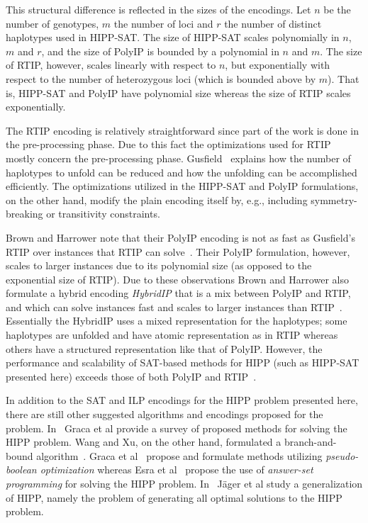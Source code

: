 \documentclass[12pt,a4paper]{article}
\begin{document}
This structural difference is reflected in the sizes of the encodings.
Let $n$ be the number of genotypes, $m$ the number of loci and $r$ the number of distinct haplotypes used in HIPP-SAT.
The size of HIPP-SAT scales polynomially in $n$, $m$ and $r$, and the size of PolyIP is bounded by a polynomial in $n$ and $m$.
The size of RTIP, however, scales linearly with respect to $n$, but exponentially with respect to the number of heterozygous loci (which is bounded above by $m$).
That is, HIPP-SAT and PolyIP have polynomial size whereas the size of RTIP scales exponentially.

The RTIP encoding is relatively straightforward since part of the work is done in the pre-processing phase.
Due to this fact the optimizations used for RTIP mostly concern the pre-processing phase.
Gusfield~\cite{DBLP:conf/cpm/Gusfield03} explains how the number of haplotypes to unfold can be reduced and how the unfolding can be accomplished efficiently.
The optimizations utilized in the HIPP-SAT and PolyIP formulations, on the other hand, modify the plain encoding itself by, e.g., including symmetry-breaking or transitivity constraints.

Brown and Harrower note that their PolyIP encoding is not as fast as Gusfield's RTIP over instances that RTIP can solve~\cite{DBLP:journals/tcbb/BrownH06}.
Their PolyIP formulation, however, scales to larger instances due to its polynomial size (as opposed to the exponential size of RTIP).
Due to these observations Brown and Harrower also formulate a hybrid encoding \emph{HybridIP} that is a mix between PolyIP and RTIP, and which can solve instances fast and scales to larger instances than RTIP~\cite{DBLP:conf/cpm/Gusfield03}.
Essentially the HybridIP uses a mixed representation for the haplotypes; 
some haplotypes are unfolded and have atomic representation as in RTIP whereas others have a structured representation like that of PolyIP.
However, the performance and scalability of SAT-based methods for HIPP (such as HIPP-SAT presented here) exceeds those of both PolyIP and RTIP~\cite{DBLP:journals/jcb/GracaLMO10}.


In addition to the SAT and ILP encodings for the HIPP problem presented here, there are still other suggested algorithms and encodings proposed for the problem.
In~\cite{DBLP:journals/jcb/GracaLMO10} Graca et al provide a survey of proposed methods for solving the HIPP problem.
Wang and Xu, on the other hand, formulated a branch-and-bound algorithm~\cite{DBLP:journals/bioinformatics/WangX03a}.
Graca et al~\cite{DBLP:journals/anor/GracaMLO11} propose and formulate methods utilizing \emph{pseudo-boolean optimization} 
whereas Esra et al~\cite{DBLP:conf/lpnmr/ErdemET09} propose the use of \emph{answer-set programming} for solving the HIPP problem.
In~\cite{DBLP:journals/jda/JagerCZ16} Jäger et al study a generalization of HIPP, namely the problem of generating all optimal solutions to the HIPP problem.






\end{document}
